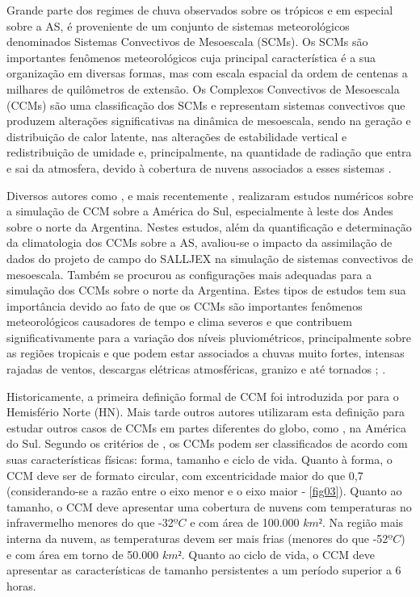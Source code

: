 Grande parte dos regimes de chuva observados sobre os trópicos e em especial sobre a AS, é proveniente de um conjunto de sistemas meteorológicos denominados Sistemas Convectivos de Mesoescala (SCMs). Os SCMs são importantes fenômenos meteorológicos cuja principal característica é a sua organização em diversas formas, mas com escala espacial da ordem de centenas a milhares de quilômetros de extensão. Os Complexos Convectivos de Mesoescala (CCMs) são uma classificação dos SCMs e representam sistemas convectivos que produzem alterações significativas na dinâmica de mesoescala, sendo na geração e distribuição de calor latente, nas alterações de estabilidade vertical e redistribuição de umidade e, principalmente, na quantidade de radiação que entra e sai da atmosfera, devido à cobertura de nuvens associados a esses sistemas \cite{velascofritsch87}.

Diversos autores como ,  e mais recentemente , realizaram estudos numéricos sobre a simulação de CCM sobre a América do Sul, especialmente à leste dos Andes sobre o norte da Argentina. Nestes estudos, além da quantificação e determinação da climatologia dos CCMs sobre a AS, avaliou-se o impacto da assimilação de dados do projeto de campo do SALLJEX na simulação de sistemas convectivos de mesoescala. Também  se procurou as configurações mais adequadas para a simulação dos CCMs sobre o norte da Argentina. Estes tipos de estudos tem sua importância devido ao fato de que os CCMs são importantes fenômenos meteorológicos causadores de tempo e clima severos e que contribuem significativamente para a variação dos níveis pluviométricos, principalmente sobre as regiões tropicais e que podem estar associados a chuvas muito fortes, intensas rajadas de ventos, descargas elétricas atmosféricas, granizo e até tornados \cite{maddox80}; \cite{menezessilvadias04}.

Historicamente, a primeira definição formal de CCM foi introduzida por  para o Hemisfério Norte (HN). Mais tarde outros autores utilizaram esta definição para estudar outros casos de CCMs em partes diferentes do globo, como , na América do Sul. Segundo os critérios de , os CCMs podem ser classificados de acordo com suas características físicas: forma, tamanho e ciclo de vida. Quanto à forma, o CCM deve ser de formato circular, com excentricidade maior do que 0,7 (considerando-se a razão entre o eixo menor e o eixo maior - \autoref{fig03}). Quanto ao tamanho, o CCM deve apresentar uma cobertura de nuvens com temperaturas no infravermelho menores do que -32$ºC$ e com área de 100.000 $km²$. Na região mais interna da nuvem, as temperaturas devem ser mais frias (menores do que -52$ºC$) e com área em torno de 50.000 $km²$. Quanto ao ciclo de vida, o CCM deve apresentar as características de tamanho persistentes a um período superior a 6 horas.

